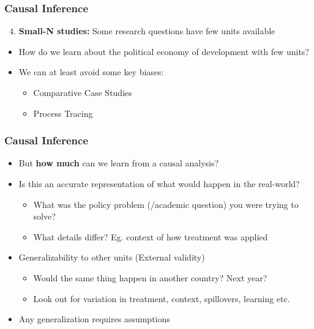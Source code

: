 \documentclass[xcolor=x11names,compress]{beamer}\usepackage[]{graphicx}\usepackage[]{color}
\renewcommand{\(}{\begin{columns}}
\renewcommand{\)}{\end{columns}}
\newcommand{\<}[1]{\begin{column}{#1}}
\renewcommand{\>}{\end{column}}
\begin{document}
\begin{frame}
\frametitle{Causal Inference}
\begin{enumerate}
 \setcounter{enumi}{3}
\item \textbf{Small-N studies:} Some research questions have few units available
\end{enumerate}
\begin{itemize}
\item How do we learn about the political economy of development with few units?
\item We can at least avoid some key biases:
\begin{itemize}
\item Comparative Case Studies
\item Process Tracing
\end{itemize}
\end{itemize}
\end{frame}



\begin{frame}
\frametitle{Causal Inference}
\begin{itemize}
\item But \textbf{how much} can we learn from a causal analysis?
\item Is this an accurate representation of what would happen in the real-world?
\begin{itemize}
\item What was the policy problem (/academic question) you were trying to solve?
\item What details differ? Eg. context of how treatment was applied
\end{itemize}
\item Generalizability to other units (External validity)
\begin{itemize}
\item Would the same thing happen in another country? Next year?
\item Look out for variation in treatment, context, spillovers, learning etc.
\end{itemize}
\item Any generalization requires assumptions
\end{itemize}
\end{frame}
\end{document}
